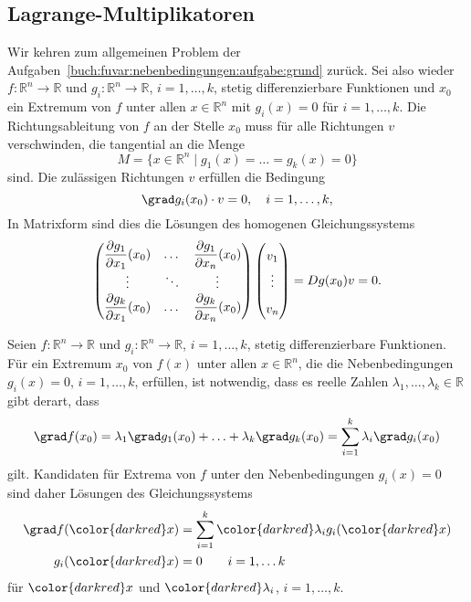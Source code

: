 \subsection{Lagrange-Multiplikatoren}
Wir kehren zum allgemeinen Problem der
Aufgaben~\ref{buch:fuvar:nebenbedingungen:aufgabe:grund}
zurück.
Sei also wieder $f\colon \mathbb{R}^n\to\mathbb{R}$
und
$g_i\colon\mathbb{R}^n\to\mathbb{R}$, $i=1,\dots,k$,
stetig differenzierbare Funktionen und $x_0$ ein Extremum
von $f$ unter allen $x\in\mathbb{R}^n$ mit $g_i(x)=0$ für $i=1,\dots,k$.
Die Richtungsableitung von $f$ an der Stelle $x_0$ muss für alle
Richtungen $v$ verschwinden, die tangential an die Menge
\[
M
=
\{
x\in\mathbb{R}^n
\mid
g_1(x)=\ldots=g_k(x)=0
\}
\]
sind.
Die zulässigen Richtungen $v$ erfüllen die Bedingung
\[
\grad g_i(x_0)\cdot v  = 0,\quad i=1,\dots,k,
\]
In Matrixform sind dies die Lösungen des homogenen Gleichungssystems
\[
{\renewcommand{\arraystretch}{1.2}
\begin{pmatrix}
\displaystyle\frac{\partial g_1}{\partial x_1}(x_0)
&\dots&
\displaystyle\frac{\partial g_1}{\partial x_n}(x_0)
\\
\vdots&\ddots&\vdots\\
\displaystyle\frac{\partial g_k}{\partial x_1}(x_0)
&\dots&
\displaystyle\frac{\partial g_k}{\partial x_n}(x_0)
\end{pmatrix}}
\renewcommand{\arraystretch}{1.7}
\begin{pmatrix}
v_1\\
\vdots\\
v_n
\end{pmatrix}
=
Dg(x_0) v
=
0.
\]

\begin{satz}
\label{buch:fuvar:nebenbedingungen:satz:lm}
Seien $f\colon\mathbb{R}^n\to\mathbb{R}$ und
$g_i\colon\mathbb{R}^n\to\mathbb{R}$, $i=1,\dots,k$, stetig
differenzierbare Funktionen.
Für ein Extremum $x_0$ von $f(x)$ unter allen $x\in\mathbb{R}^n$,
die die Nebenbedingungen $g_i(x)=0$, $i=1,\dots,k$, erfüllen, ist notwendig,
dass es reelle Zahlen $\lambda_1,\dots,\lambda_k\in\mathbb{R}$ gibt derart,
dass
\[
\grad f(x_0)
=
\lambda_1\grad g_1(x_0)
+\ldots+
\lambda_k\grad g_k(x_0)
=
\sum_{i=1}^k \lambda_i \grad g_i(x_0)
\]
gilt.
Kandidaten für Extrema von $f$ unter den Nebenbedingungen $g_i(x)=0$ sind
daher Lösungen des Gleichungssystems
\begin{equation}
\begin{aligned}
\grad f({\color{darkred}x})
&=
\sum_{i=1}^k {\color{darkred}\lambda_i} g_i({\color{darkred}x})
\\
g_i({\color{darkred}x})
&= 
0\qquad i=1,\dots k
\end{aligned}
\label{buch:fuvar:nebenbedingungen:eqn:lm}
\end{equation}
für ${\color{darkred}x}$ und ${\color{darkred}\lambda_i}$, $i=1,\dots,k$.
\end{satz}

